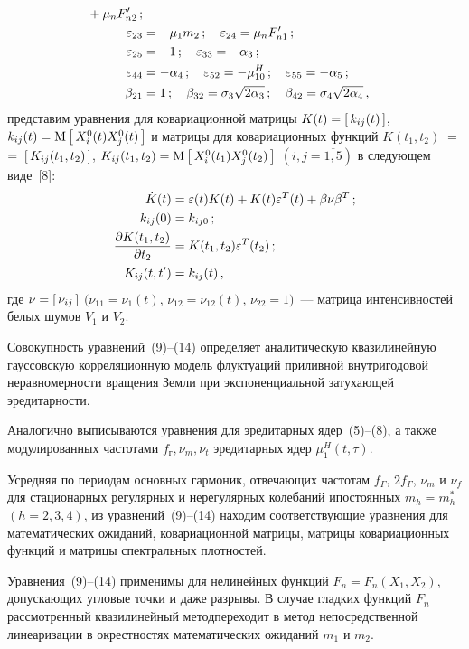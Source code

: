 \begin{multicols}{2}
\begin{align*}
 {}+\mu_n F_{n2}'\,;\\
 \varepsilon_{23} &=-\mu_1m_2\,;\quad \varepsilon_{24} = \mu_n F_{n1}'\,;\\
\varepsilon_{25}&= -1\,; \quad \varepsilon_{33} = -\alpha_3\,;\\
  \varepsilon_{44} &= -\alpha_4\,;\quad \varepsilon_{52}= -\mu_{10}^H\,;\quad \varepsilon_{55}= -\alpha_5\,;\\
\beta_{21} &=1\,;\quad \beta_{32} =\sigma_3\sqrt{2\alpha_3}\,;\quad 
\beta_{42} =\sigma_4\sqrt{2\alpha_4}\,,
\end{align*}
представим уравнения  для ковариационной матрицы  $K(t)=\left[\,
k_{ij}(t)\,\right]$, $k_{ij}(t) ={\rm M} \left[\, X_i^0 (t) X_j^0 (t)\,\right]$ и
мат\-ри\-цы для ковариационных функций $K(t_1, t_2)\; =$\linebreak $=\; \left[\, K_{ij} (t_1,
t_2)\,\right]$, $ K_{ij} (t_1, t_2) ={\rm M} \left[\, X_i^0 (t_1) X_j^0 (t_2)\,\right]$
$(i,j=\overline{1,5})$ в следующем виде~[8]:
\begin{align}  
\dot K(t) &= \varepsilon (t) K(t) + K(t) \varepsilon^T(t) +\beta \nu \beta^T\,;\\
k_{ij} (0) &= k_{ij0}\,;\\
\displaystyle\frac{\displaystyle \partial K(t_1, t_2)\mathstrut}{\displaystyle \partial t_2\mathstrut} &= K(t_1, t_2) \varepsilon^T(t_2)\,;\\
K_{ij} (t, t') &= k_{ij} (t)\,,
\end{align}
где $\nu =\left[\, \nu_{ij}\,\right]$ $( \nu_{11} = \nu_1 (t)$, $\nu_{12}
=\nu_{12} (t)$, $ \nu_{22}=1)$~--- матрица интенсивностей белых шумов
$V_1$ и $V_2$.

Совокупность уравнений~(9)--(14) определяет аналитическую
квазилинейную гауссовскую корреляционную модель флуктуаций приливной
внут\-ри\-го\-до\-вой не\-рав\-но\-мер\-ности вращения Земли при экспоненциальной
затухающей эредитарности.

Аналогично выписываются уравнения для эредитарных ядер~(5)--(8), а
также модулированных частотами $f_{\mathrm{г}},\nu_m,\nu_t$
эредитарных ядер $\mu_1^H (t,\tau)$.

Усредняя по периодам основных гармоник, отвечающих частотам
$f_\Gamma$, $2f_\Gamma$, $\nu_m$ и $\nu_f$ для стационарных регулярных и
нерегулярных колебаний и\linebreak постоянных $m_h = m_h^*$ $(h= 2,3,4)$, из
уравнений~(9)--(14) находим соответствующие урав\-не\-ния для
математических ожиданий, ковариационной мат\-ри\-цы, мат\-ри\-цы
ковариационных функ\-ций и мат\-ри\-цы спектральных плотностей.

Уравнения~(9)--(14)  применимы для нелинейных функций $F_n  =
F_n (X_1, X_2)$, допускающих угловые точки и даже разрывы. В случае
гладких функций  $F_n$ рассмотренный квазилинейный метод\linebreak переходит в
метод непосредственной линеаризации в окрестностях математических
ожиданий  $m_1$ и $m_2$.


\end{multicols}
